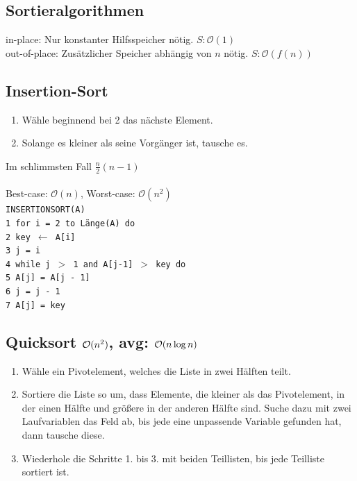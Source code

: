 \documentclass[fs, footer]{latex4ei}
\renewcommand{\t}{\texttt}
\begin{document}
\begin{multicols*}{4}
{{\section{Sortieralgorithmen}
in-place: Nur konstanter Hilfsspeicher nötig. $S:\mathcal O(1)$\\
out-of-place: Zusätzlicher Speicher abhängig von $n$ nötig. $S:\mathcal O(f(n))$\\


\subsection{Insertion-Sort}
\begin{enumerate}
	\item Wähle beginnend bei 2 das nächste Element. 
	\item Solange es kleiner als seine Vorgänger ist, tausche es.
\end{enumerate}
Im schlimmsten Fall $\frac{n}{2}(n-1)$\\
\\Best-case: $\mathcal{O}(n)$, Worst-case: $\mathcal{O}(n^2)$\\
\t{INSERTIONSORT(A)\\
1\ for i = 2 to Länge(A) do\\
2\ \quad key $\leftarrow$ A[i]\\
3\ \quad j = i\\
4\ \quad while j $>$ 1 and A[j-1] $>$ key do\\
5\ \qquad 	A[j] = A[j - 1]\\
6\ \qquad 	j = j - 1\\
7\ \quad 	A[j] = key
}

\subsection{Quicksort $\operatorname{\mathcal O}(n^2)$, avg: $\operatorname{\mathcal O}(n\log n)$}
\begin{enumerate}
	\item Wähle ein Pivotelement, welches die Liste in zwei Hälften teilt. 
	\item Sortiere die Liste so um, dass Elemente, die kleiner als das Pivotelement, in der einen Hälfte und größere in der anderen Hälfte sind. 
		Suche dazu mit zwei Laufvariablen das Feld ab, bis jede eine unpassende Variable gefunden hat, dann tausche diese.
	\item Wiederhole die Schritte 1. bis 3. mit beiden Teillisten, bis jede Teilliste sortiert ist.
\end{enumerate}

}}
\end{multicols*}
\end{document}
